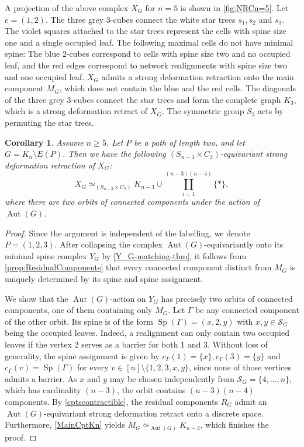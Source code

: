 \documentclass[reqno,dvipsnames]{amsart}
\theoremstyle{plain}
\newtheorem{corollary}[theorem]{Corollary}
\numberwithin{equation}{section}
\theoremstyle{definition}
\DeclareMathOperator{\Sp}{Sp}
\DeclareMathOperator{\Aut}{Aut}
\begin{document}
A projection of the above complex $X_G$ for $n=5$ is shown in \autoref{fig:NRCn=5}. Let $e=(1,2)$. The three grey 3-cubes connect the white star trees $s_1,s_2$ and $s_3$. The violet squares attached to the star trees represent the cells with spine size one and a single occupied leaf. The following maximal cells do not have minimal spine: The blue 2-cubes correspond to cells with spine size two and no occupied leaf, and the red edges correspond to network realignments with spine size two and one occupied leaf. $X_G$ admits a strong deformation retraction onto the main component $M_G$, which does not contain the blue and the red cells. The diagonals of the three grey 3-cubes connect the star trees and form the complete graph $K_3$, which is a strong deformation retract of $X_G$. The symmetric group $S_3$ acts by permuting the star trees. 


\begin{corollary}\label{2PathM}
	Assume $n\geq 5$. Let $P$ be a path of length two, and let $G=K_n\setminus E(P)$. Then we have the following $(S_{n-3}\times C_2)$-equivariant strong deformation retraction of $X_G$:
	\begin{equation*}
		X_G \simeq_{(S_{n-3}\times C_2)} K_{n-3} \cup \coprod\limits_{i=1}^{(n-3)(n-4)} \{\ast\},
	\end{equation*}
	where there are two orbits of connected components under the action of $\Aut(G)$.
\end{corollary}

\begin{proof}
	Since the argument is independent of the labelling, we denote $P=(1,2,3)$. After collapsing the complex $\Aut(G)$-equivariantly onto its minimal spine complex $Y_G$ by \autoref{Y_G-matching-thm}, it follows from \autoref{prop:ResidualComponents} that every connected component distinct from $M_G$ is uniquely determined by its spine and spine assignment.
	
	We show that the $\Aut(G)$-action on $Y_G$ has precisely two orbits of connected components, one of them containing only $M_G$. Let $\Gamma$ be any connected component of the other orbit. Its spine is of the form $\Sp(\Gamma)=(x,2,y)$ with $x,y\in \mathcal{S}_G$ being the occupied leaves. Indeed, a realignment can only contain two occupied leaves if the vertex 2 serves as a barrier for both 1 and 3. Without loss of generality, the spine assignment is given by $c_{\Gamma}(1)=\{x\},c_{\Gamma}(3)=\{y\}$ and $c_{\Gamma}(v)=\Sp(\Gamma)$ for every $v\in [n]\setminus\{1,2,3,x,y\}$, since none of those vertices admits a barrier. As $x$ and $y$ may be chosen independently from $\mathcal{S}_G=\{4,\dots,n\}$, which has cardinality $(n-3)$, the orbit contains $(n-3)(n-4)$ components. By \autoref{cptscontractible}, the residual components $R_G$ admit an $\Aut(G)$-equivariant strong deformation retract onto a discrete space. Furthermore, \autoref{MainCptKn} yields $M_G\simeq_{\Aut(G)} K_{n-3}$, which finishes the proof.
\end{proof}
\end{document}
